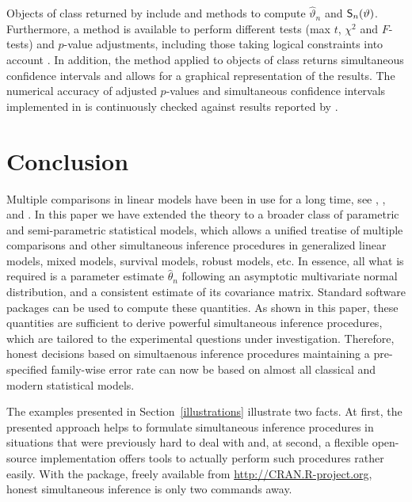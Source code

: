 \documentclass[12pt,a4paper]{article}
\begin{document}
Objects of class  returned by  include %
 and  methods to compute $\hat{\vartheta}_n$ and $%
\S_n(\vartheta)$. Furthermore, a  method is available to perform
different tests (max $t$, $\chi^2$ and $F$-tests) and $p$-value adjustments,
including those taking logical constraints into account \citep{Shaffer1986,
Westfall1997}. In addition, the  method applied to objects
of class  returns simultaneous confidence intervals and allows
for a graphical representation of the results. The numerical accuracy of
adjusted $p$-values and simultaneous confidence intervals implemented in %
 is continuously checked against results reported by \cite%
{Westfall1999}.





\section{Conclusion}

Multiple comparisons in linear models have been in use for a long time, see 
\cite{HochbergTamhane1987}, \cite{Hsu1996}, and \cite{Bretzetal2008}. In
this paper we have extended the theory to a broader class of parametric and
semi-parametric statistical models, which allows a unified treatise of
multiple comparisons and other simultaneous inference procedures in
generalized linear models, mixed models, survival models, robust models, etc.
In essence, all what is required is a parameter estimate $\hat{\theta}_n$
following an asymptotic multivariate normal distribution, and a consistent
estimate of its covariance matrix. Standard software packages
can be used to compute these quantities. As shown in this paper, these
quantities are sufficient to derive powerful simultaneous inference
procedures, which are tailored to the experimental questions under
investigation. Therefore, honest decisions based on simultaenous inference
procedures maintaining a pre-specified family-wise error rate can now be
based on almost all classical and modern statistical models.

The examples presented in Section~\ref{illustrations} illustrate two facts.
At first, the presented approach helps to formulate simultaneous inference
procedures in situations that were previously hard to deal with and, at
second, a flexible open-source implementation offers tools to actually
perform such procedures rather easily. With the  package,
freely available from \url{http://CRAN.R-project.org}, honest simultaneous
inference is only two commands away. 



\end{document}
